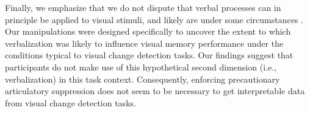Finally, we emphasize that we do not dispute that verbal processes can in principle be applied to visual stimuli, and likely are under some circumstances \citep[e.g.][]{Brandimonte:etal:1992}. Our manipulations were designed specifically to uncover the extent to which verbalization was likely to influence visual memory performance under the conditions typical to visual change detection tasks. Our findings suggest that participants do not make use of this hypothetical second dimension (i.e., verbalization) in this task context. Consequently, enforcing precautionary articulatory suppression does not seem to be necessary to get interpretable data from visual change detection tasks.